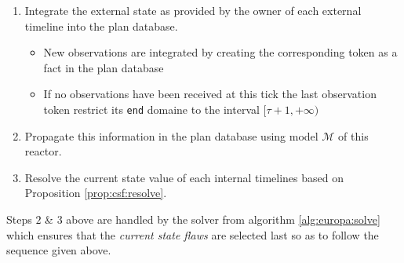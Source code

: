 \begin{enumerate}

\item Integrate the external state as provided by the owner of each
  external timeline into the plan database. 
  \begin{itemize}
  \item New observations are integrated by creating the
    corresponding token as a fact in the plan database
  \item If no observations have been received at this tick the last
    observation token restrict its \texttt{end} domaine to the
    interval $[\tau+1, +\infty)$
  \end{itemize}

\item Propagate this information in the plan database using model
  $\mathcal{M}$ of this reactor.

\item Resolve the current state value of each internal timelines based
  on Proposition \ref{prop:csf:resolve}.

\end{enumerate}



Steps $2$ \& $3$ above are handled by the \eu solver from algorithm
\ref{alg:europa:solve} which ensures that the {\em current state
  flaws} are selected last so as to follow the sequence given
above. 

